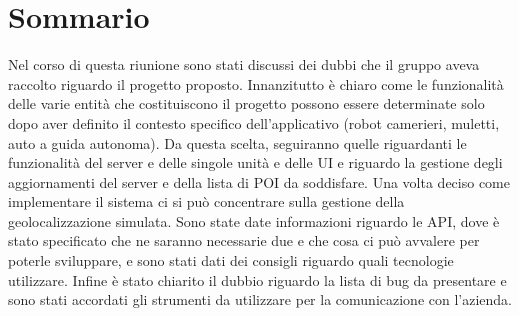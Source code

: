 \section{Sommario}
Nel	corso di questa riunione sono stati discussi dei dubbi che il gruppo aveva raccolto riguardo il progetto proposto. 
Innanzitutto è chiaro come le funzionalità delle varie entità che costituiscono il progetto possono essere determinate solo dopo aver definito il contesto specifico dell'applicativo (robot camerieri, muletti, auto a guida autonoma).
Da questa scelta, seguiranno quelle riguardanti le funzionalità del server e delle singole unità e delle UI e riguardo la gestione degli aggiornamenti del server e della lista di POI da soddisfare. Una volta deciso come implementare il sistema ci si può concentrare sulla gestione della geolocalizzazione simulata.
Sono state date informazioni riguardo le API, dove è stato specificato che ne saranno necessarie due e che cosa ci può avvalere per poterle sviluppare, e sono stati dati dei consigli riguardo quali tecnologie utilizzare.
Infine è stato chiarito il dubbio riguardo la lista di bug da presentare e sono stati accordati gli strumenti da utilizzare per la comunicazione con l'azienda.
